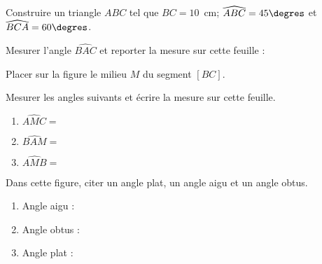 \begin{myenumerate}
\item Construire un triangle $ABC$ tel que $BC=10$~cm;
$\widehat{ABC}=45\degres$ et $\widehat{BCA}=60\degres$.
\item Mesurer l'angle $\widehat{BAC}$ et reporter la mesure sur cette
feuille : \dotfill
\item Placer sur la figure le milieu $M$ du segment $[BC]$.
\item Mesurer les angles suivants et écrire la mesure sur cette
feuille.
  \begin{multicols}{3}
    \begin{enumerate}
    \item $\widehat{AMC}=$ \dotfill
    \item $\widehat{BAM}=$ \dotfill
    \item $\widehat{AMB}=$ \dotfill
    \end{enumerate}
  \end{multicols}
\item Dans cette figure, citer un angle plat, un angle aigu et un
angle obtus.
  \begin{multicols}{3}
    \begin{enumerate}
    \item Angle aigu : \dotfill
    \item Angle obtus : \dotfill
    \item Angle plat : \dotfill
    \end{enumerate}
  \end{multicols}
\end{myenumerate}